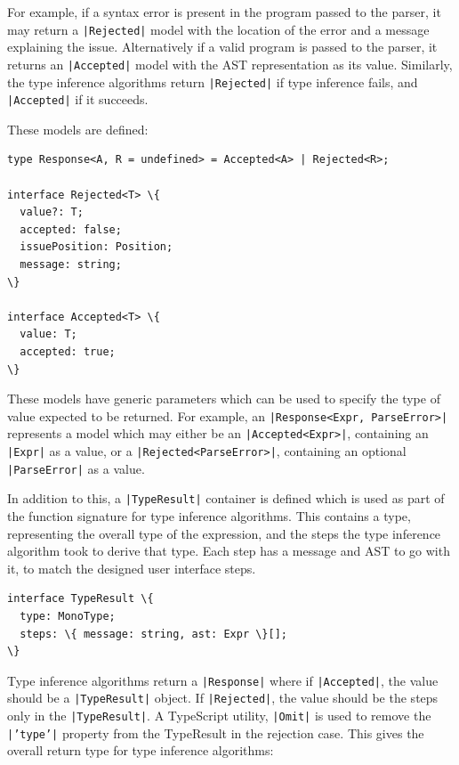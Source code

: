 \documentclass[a4paper,fleqn,twoside,12pt]{report}
\begin{document}
For example, if a syntax error is present in the program passed to the parser, it may return a \texttt{|Rejected|} model with the location of the error and a message explaining the issue. Alternatively if a valid program is passed to the parser, it returns an \texttt{|Accepted|} model with the AST representation as its value. Similarly, the type inference algorithms return \texttt{|Rejected|} if type inference fails, and \texttt{|Accepted|} if it succeeds.

These models are defined:

\begin{verbatim}
type Response<A, R = undefined> = Accepted<A> | Rejected<R>;

interface Rejected<T> \{
  value?: T;
  accepted: false;
  issuePosition: Position;
  message: string;
\}

interface Accepted<T> \{
  value: T;
  accepted: true;
\}
\end{verbatim}

These models have generic parameters which can be used to specify the type of value expected to be returned. For example, an \texttt{|Response<Expr, ParseError>|} represents a model which may either be an \texttt{|Accepted<Expr>|}, containing an \texttt{|Expr|} as a value, or a \texttt{|Rejected<ParseError>|}, containing an optional \texttt{|ParseError|} as a value.

In addition to this, a \texttt{|TypeResult|} container is defined which is used as part of the function signature for type inference algorithms. This contains a type, representing the overall type of the expression, and the steps the type inference algorithm took to derive that type. Each step has a message and AST to go with it, to match the designed user interface steps.

\begin{verbatim}
interface TypeResult \{
  type: MonoType;
  steps: \{ message: string, ast: Expr \}[];
\}
\end{verbatim}

Type inference algorithms return a \texttt{|Response|} where if \texttt{|Accepted|}, the value should be a \texttt{|TypeResult|} object. If \texttt{|Rejected|}, the value should be the steps only in the \texttt{|TypeResult|}. A TypeScript utility, \texttt{|Omit|} is used to remove the \texttt{|’type’|} property from the TypeResult in the rejection case. This gives the overall return type for type inference algorithms:
\end{document}
